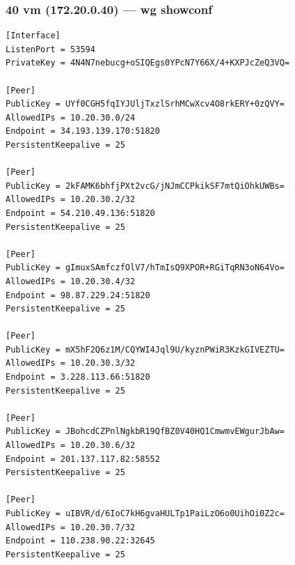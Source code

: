 \documentclass[11pt,a4paper]{article}
\begin{document}
\subsubsection*{40 vm (172.20.0.40) — wg showconf}
\begin{lstlisting}
[Interface]
ListenPort = 53594
PrivateKey = 4N4N7nebucg+oSIQEgs0YPcN7Y66X/4+KXPJcZeQ3VQ=

[Peer]
PublicKey = UYf0CGH5fqIYJUljTxzlSrhMCwXcv4O8rkERY+0zQVY=
AllowedIPs = 10.20.30.0/24
Endpoint = 34.193.139.170:51820
PersistentKeepalive = 25

[Peer]
PublicKey = 2kFAMK6bhfjPXt2vcG/jNJmCCPkikSF7mtQiOhkUWBs=
AllowedIPs = 10.20.30.2/32
Endpoint = 54.210.49.136:51820
PersistentKeepalive = 25

[Peer]
PublicKey = gImuxSAmfczfOlV7/hTmIsQ9XPOR+RGiTqRN3oN64Vo=
AllowedIPs = 10.20.30.4/32
Endpoint = 98.87.229.24:51820
PersistentKeepalive = 25

[Peer]
PublicKey = mX5hF2Q6z1M/CQYWI4Jql9U/kyznPWiR3KzkGIVEZTU=
AllowedIPs = 10.20.30.3/32
Endpoint = 3.228.113.66:51820
PersistentKeepalive = 25

[Peer]
PublicKey = JBohcdCZPnlNgkbR19QfBZ0V40HQ1CmwmvEWgurJbAw=
AllowedIPs = 10.20.30.6/32
Endpoint = 201.137.117.82:58552
PersistentKeepalive = 25

[Peer]
PublicKey = uIBVR/d/6IoC7kH6gvaHULTp1PaiLzO6o0UihOi0Z2c=
AllowedIPs = 10.20.30.7/32
Endpoint = 110.238.90.22:32645
PersistentKeepalive = 25

\end{lstlisting}
\end{document}
